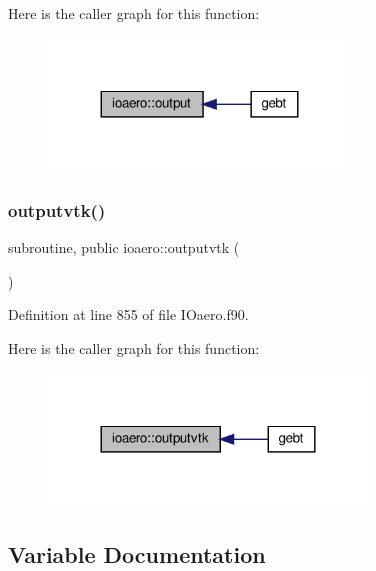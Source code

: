 Here is the caller graph for this function\+:\nopagebreak
\begin{figure}[H]
\begin{center}
\leavevmode
\includegraphics[width=227pt]{namespaceioaero_a1f2f8f2b4f6e233d2753c1fd1809a44a_icgraph}
\end{center}
\end{figure}
\mbox{\label{namespaceioaero_a7eb68cb1588d24e05c8f056ca107e163}} 
\subsubsection{\texorpdfstring{outputvtk()}{outputvtk()}}
{\footnotesize\ttfamily subroutine, public ioaero\+::outputvtk (\begin{DoxyParamCaption}{ }\end{DoxyParamCaption})}



Definition at line 855 of file I\+Oaero.\+f90.

Here is the caller graph for this function\+:\nopagebreak
\begin{figure}[H]
\begin{center}
\leavevmode
\includegraphics[width=240pt]{namespaceioaero_a7eb68cb1588d24e05c8f056ca107e163_icgraph}
\end{center}
\end{figure}


\subsection{Variable Documentation}
\mbox{\label{namespaceioaero_afb280b6ca8de323c9a07076df81a71e1}} 
